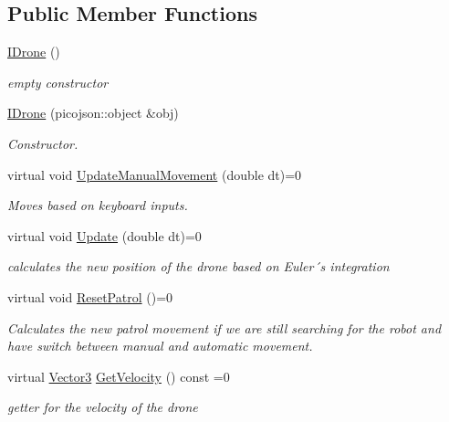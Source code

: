 \subsection*{Public Member Functions}
\begin{DoxyCompactItemize}
\item 
\mbox{\label{classIDrone_a28f6e8348bbf76a50009dd1577e616c2}} 
\hyperlink{classIDrone_a28f6e8348bbf76a50009dd1577e616c2}{I\+Drone} ()
\begin{DoxyCompactList}\small\item\em empty constructor \end{DoxyCompactList}\item 
\hyperlink{classIDrone_a7376a746197d7d24f09b8ad94fcee465}{I\+Drone} (picojson\+::object \&obj)
\begin{DoxyCompactList}\small\item\em Constructor. \end{DoxyCompactList}\item 
virtual void \hyperlink{classIDrone_a82486b4192f6ccf8b3d93fbb9101f2dd}{Update\+Manual\+Movement} (double dt)=0
\begin{DoxyCompactList}\small\item\em Moves based on keyboard inputs. \end{DoxyCompactList}\item 
virtual void \hyperlink{classIDrone_a6d840d60cda9a985b94af42ef54520b7}{Update} (double dt)=0
\begin{DoxyCompactList}\small\item\em calculates the new position of the drone based on Euler´s integration \end{DoxyCompactList}\item 
\mbox{\label{classIDrone_aa7f5edb37f005c3afc94213eeee75283}} 
virtual void \hyperlink{classIDrone_aa7f5edb37f005c3afc94213eeee75283}{Reset\+Patrol} ()=0
\begin{DoxyCompactList}\small\item\em Calculates the new patrol movement if we are still searching for the robot and have switch between manual and automatic movement. \end{DoxyCompactList}\item 
virtual \hyperlink{classVector3}{Vector3} \hyperlink{classIDrone_abad6c0adb60d6deceb13f30687fed57b}{Get\+Velocity} () const =0
\begin{DoxyCompactList}\small\item\em getter for the velocity of the drone \end{DoxyCompactList}\item 

\end{DoxyCompactItemize}
